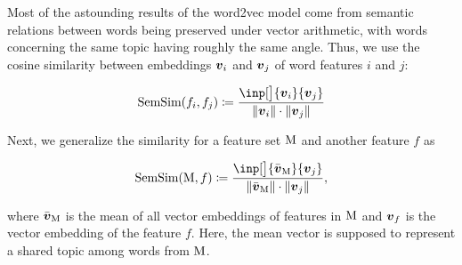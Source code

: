 Most of the astounding results of the word2vec model come from semantic relations between words being preserved under vector arithmetic, with words concerning the same topic having roughly the same angle. Thus, we use the cosine similarity between embeddings $\embed_{i}$ and $\embed_{j}$ of word features $i$ and $j$:

\begin{equation}
	\semsim( f_{i}, f_{j} ) \coloneqq \frac{\inp[\big]{\embed_{i}}{\embed_{j}}}{\| \embed_{i} \| \cdot \| \embed_{j} \|}
\end{equation}

Next, we generalize the similarity for a feature set $\text{M}$ and another feature $f$ as

\begin{equation}
	\semsim( \featset, f ) \coloneqq \frac{\inp[\big]{\bar{\embed}_{\featset}}{\embed_{j}}}{\| \bar{\embed}_{\featset} \| \cdot \| \embed_{j} \|},
\end{equation}

where $\bar{\embed}_{\featset}$ is the mean of all vector embeddings of features in $\text{M}$ and $\embed_{f}$ is the vector embedding of the feature $f$. Here, the mean vector is supposed to represent a shared topic among words from $\text{M}$.